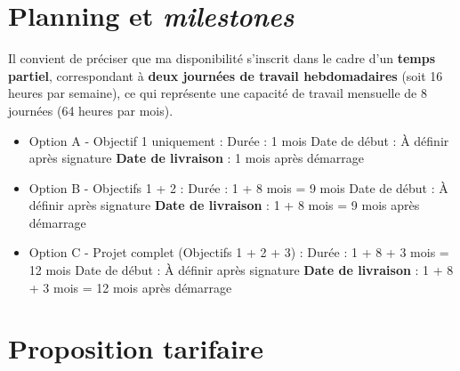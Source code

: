 \documentclass[11pt,a4paper]{article}
\begin{document}
\section{Planning et \textit{milestones}}
Il convient de préciser que ma disponibilité s'inscrit dans le cadre d'un \textbf{temps partiel}, correspondant à \textbf{deux journées de travail hebdomadaires} (soit 16 heures par semaine), ce qui représente une capacité de travail mensuelle de 8 journées (64 heures par mois).

\begin{itemize}
    \item Option A - Objectif 1 uniquement : \newline
            Durée : 1 mois \newline
            Date de début : À définir après signature \newline
            \textbf{Date de livraison} : 1 mois après démarrage \newline

    \item Option B - Objectifs 1 + 2 : \newline
            Durée : 1 + 8 mois = 9 mois \newline
            Date de début : À définir après signature \newline
            \textbf{Date de livraison} : 1 + 8 mois = 9 mois après démarrage \newline

    \item Option C - Projet complet (Objectifs 1 + 2 + 3) : \newline
            Durée : 1 + 8 + 3 mois = 12 mois \newline
            Date de début : À définir après signature \newline
            \textbf{Date de livraison} : 1 + 8 + 3 mois = 12 mois après démarrage \newline

\end{itemize}

\section{Proposition tarifaire}
\end{document}

